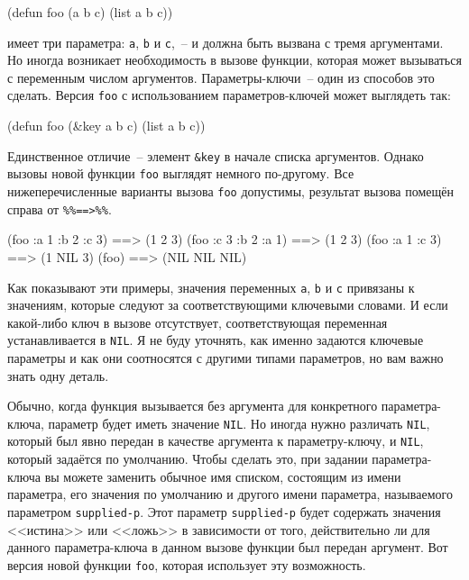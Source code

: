 \begin{myverb}
(defun foo (a b c) (list a b c))
\end{myverb}

\noindent{}имеет три параметра: \lstinline{a}, \lstinline{b} и \lstinline{c},~-- и должна быть вызвана с тремя
аргументами. Но иногда возникает необходимость в вызове функции, которая может вызываться
с переменным числом аргументов. Параметры-ключи~-- один из способов это сделать. Версия
\lstinline{foo} с использованием параметров-ключей может выглядеть так:

\begin{myverb}
(defun foo (&key a b c) (list a b c))
\end{myverb}

Единственное отличие~-- элемент \lstinline!&key! в начале списка аргументов. Однако вызовы
новой функции \lstinline{foo} выглядят немного по-другому. Все нижеперечисленные варианты
вызова \lstinline{foo} допустимы, результат вызова помещён справа от \lstinline!%%==>%%!.

\begin{myverb}
(foo :a 1 :b 2 :c 3)  ==> (1 2 3)
(foo :c 3 :b 2 :a 1)  ==> (1 2 3)
(foo :a 1 :c 3)       ==> (1 NIL 3)
(foo)                 ==> (NIL NIL NIL)
\end{myverb}

Как показывают эти примеры, значения переменных \lstinline{a}, \lstinline{b} и \lstinline{c} привязаны
к значениям, которые следуют за соответствующими ключевыми словами. И если какой-либо
ключ в вызове отсутствует, соответствующая переменная устанавливается в \lstinline{NIL}. Я не
буду уточнять, как именно задаются ключевые параметры и как они соотносятся с другими
типами параметров, но вам важно знать одну деталь.

Обычно, когда функция вызывается без аргумента для конкретного параметра-ключа, параметр
будет иметь значение \lstinline{NIL}. Но иногда нужно различать \lstinline{NIL}, который был явно
передан в качестве аргумента к параметру-ключу, и \lstinline{NIL}, который задаётся по
умолчанию. Чтобы сделать это, при задании параметра-ключа вы можете заменить обычное имя
списком, состоящим из имени параметра, его значения по умолчанию и другого имени
параметра, называемого параметром \lstinline{supplied-p}. Этот параметр \lstinline{supplied-p} будет
содержать значения <<истина>> или <<ложь>> в зависимости от того, действительно ли для
данного параметра-ключа в данном вызове функции был передан аргумент. Вот версия новой
функции \lstinline{foo}, которая использует эту возможность.

